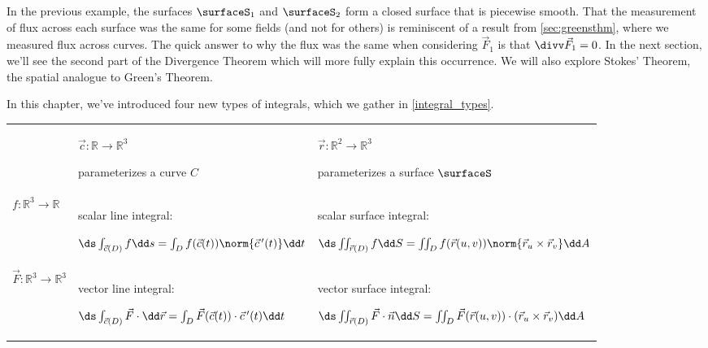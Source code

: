 In the previous example, the surfaces $\surfaceS_1$ and $\surfaceS_2$ form a closed surface that is piecewise smooth. That the measurement of flux across each surface was the same for some fields (and not for others) is reminiscent of a result from \autoref{sec:greensthm}, where we measured flux across curves. The quick answer to why the flux was the same when considering $\vec F_1$ is that $\divv \vec F_1 = 0$. In the next section, we'll see the second part of the Divergence Theorem which will more fully explain this occurrence. We will also explore Stokes' Theorem, the spatial analogue to Green's Theorem.\bigskip

In this chapter, we've introduced four new types of integrals, which we gather in \autoref{integral_types}.

{
\begin{keyidea}\label{integral_types}%
\renewcommand{\arraystretch}{2}
\setlength{\tabcolsep}{1.5em}
 \begin{tabular}{ l p{13em} p{17em} }\toprule
  & $\vec c:\mathbb{R}\to\mathbb{R}^3$\par parameterizes a curve $C$
  & $\vec r:\mathbb{R}^2\to\mathbb{R}^3$\par parameterizes a surface $\surfaceS$ \\\cmidrule(lr){2-2}\cmidrule(lr){3-3}
  $f:\mathbb{R}^3\to\mathbb{R}$
  & scalar line integral:\par
  $\ds\int_{\vec c(D)} f\dd s=\int_D f(\vec c(t))\norm{\vec c\,'(t)}\dd t$
  & scalar surface integral:\par
  $\ds\iint_{\vec r(D)} f\dd S=\iint_D f(\vec r(u,v))\norm{\vec r_u\times\vec r_v}\dd A$
  \\
  $\vec F:\mathbb{R}^3\to\mathbb{R}^3$
  & vector line integral:\par
  $\ds\int_{\vec c(D)}\vec F\cdot\dd\vec r=\int_D\vec F(\vec c(t))\cdot\vec c\,'(t)\dd t$
  & vector surface integral:\par
  $\ds\iint_{\vec r(D)}\vec F\cdot\vec n\dd S
  =\iint_D\vec F(\vec r(u,v))\cdot(\vec r_u\times\vec r_v)\dd A$
 \end{tabular}
\end{keyidea}
}


